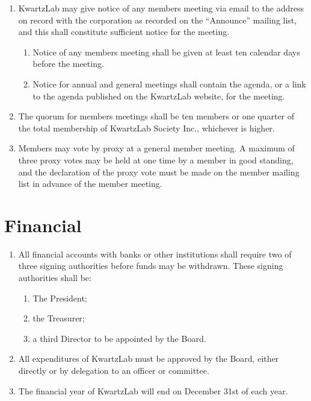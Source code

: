 \documentclass{article}
\begin{document}
\begin{enumerate}
\item KwartzLab may give notice of any members meeting via email to the address on record with the corporation as recorded on the ``Announce'' mailing list, and this shall constitute sufficient notice for the meeting.
	\begin{enumerate}
	\item Notice of any members meeting shall be given at least ten calendar days before the meeting.
	\item Notice for annual and general meetings shall contain the agenda, or a link to the agenda published on the KwartzLab website, for the meeting.
	\end{enumerate}
\item The quorum for members meetings shall be ten members or one quarter of the total membership of KwartzLab Society Inc., whichever is higher.
\item Members may vote by proxy at a general member meeting.  A maximum of three proxy votes may be held at one time by a member in good standing, and the declaration of the proxy vote must be made on the member mailing list in advance of the member meeting.
\end{enumerate}

\section{Financial}

\begin{enumerate}
\item All financial accounts with banks or other institutions shall require two of three signing authorities before funds may be withdrawn.  These signing authorities shall be:
	\begin{enumerate}
	\item The President;
	\item the Treasurer;
	\item a third Director to be appointed by the Board.
	\end{enumerate}
\item All expenditures of KwartzLab must be approved by the Board, either directly or by delegation to an officer or committee.
\item The financial year of KwartzLab will end on December 31st of each year.
\end{enumerate}
\end{document}
